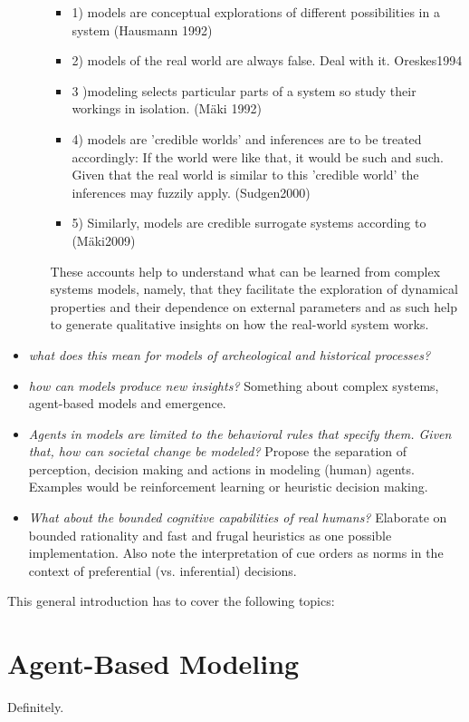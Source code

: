 \begin{itemize}
\begin{itemize}
    \begin{itemize}
    \item 1) models are conceptual explorations of different possibilities in a system (Hausmann 1992)
    \item 2) models of the real world are always false. Deal with it. Oreskes1994
    \item 3 )modeling selects particular parts of a system so study their workings in isolation. (M\"{a}ki 1992)
    \item 4) models are 'credible worlds' and inferences are to be treated accordingly: If the world were like that, it would be such and such. Given that the real world is similar to this 'credible world' the inferences may fuzzily apply. (Sudgen2000)
  \item 5) Similarly, models are credible surrogate systems according to (M\"{a}ki2009)
    \end{itemize}
    These accounts help to understand what can be learned from complex systems models, namely, that they facilitate the exploration of dynamical properties and their dependence on external parameters and as such help to generate qualitative insights on how the real-world system works.
\end{itemize}
\item \emph{what does this mean for models of archeological and historical processes?}

\item \emph{how can models produce new insights?} Something about complex systems, agent-based models and emergence.

\item \emph{Agents in models are limited to the behavioral rules that specify them. Given that, how can societal change be modeled?} Propose the separation of perception, decision making and actions in modeling (human) agents. Examples would be reinforcement learning or heuristic decision making.

\item \emph{What about the bounded cognitive capabilities of real humans?} Elaborate on bounded rationality and fast and frugal heuristics as one possible implementation. Also note the interpretation of cue orders as norms in the context of preferential (vs. inferential) decisions.

\end{itemize}


This general introduction has to cover the following topics:
\section{Agent-Based Modeling}
Definitely.

